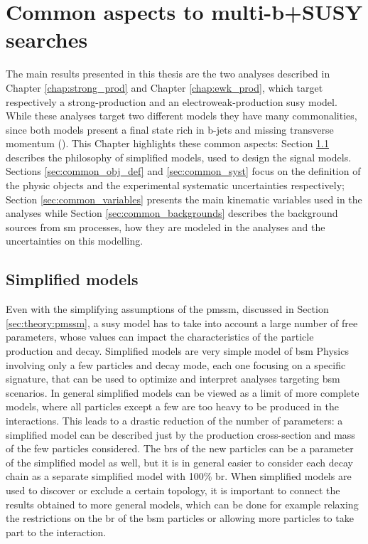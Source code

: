 \chapter{Common aspects to multi-b+\met SUSY searches}
\label{chap:multib_general}

The main results presented in this thesis are the two analyses described in Chapter \ref{chap:strong_prod} and Chapter \ref{chap:ewk_prod}, which target respectively a strong-production and an electroweak-production \gls{susy} model.
While these analyses target two different models they have many commonalities, since both models present a final state rich in b-jets and missing transverse momentum (\met). This Chapter highlights these common aspects: Section \ref{sec:simplified_models} describes the philosophy of simplified models, used to design the signal models. Sections \ref{sec:common_obj_def} and \ref{sec:common_syst} focus on the definition of the physic objects and the experimental systematic uncertainties respectively; Section \ref{sec:common_variables} presents the main kinematic variables used in the analyses while Section \ref{sec:common_backgrounds} describes the background sources from \gls{sm} processes, how they are modeled in the analyses and the uncertainties on this modelling. 

\section{Simplified models}
\label{sec:simplified_models}

Even with the simplifying assumptions of the \gls{pmssm}, discussed in Section \ref{sec:theory:pmssm}, a \gls{susy} model has to take into account a large number of free parameters, whose values can impact the characteristics of the particle production and decay. 
Simplified models \cite{Alves:2011wf} are very simple model of \gls{bsm} Physics involving only a few particles and decay mode, 
each one focusing on a specific signature, that can be used to optimize and interpret analyses targeting \gls{bsm} scenarios. 
In general simplified models can be viewed as a limit of more complete models, where all particles except a few are too heavy to be 
produced in the interactions. This leads to a drastic reduction of the number of parameters: a simplified model can be described just by the production cross-section and mass of the few particles considered. 
The \glspl{br} of the new particles can be a parameter of the simplified model as well, but it is in general easier to consider each decay chain as a separate simplified model with 100\% \gls{br}.
When simplified models are used to discover or exclude a certain topology, it is important to connect the results obtained to more general models, 
which can be done for example relaxing the restrictions on the \gls{br} of the \gls{bsm} particles or allowing more particles to take part to the interaction.

